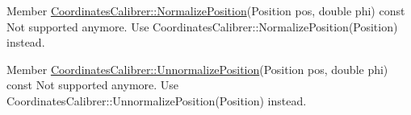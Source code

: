 \label{deprecated__deprecated000001}
\hypertarget{deprecated__deprecated000001}{}
 
\begin{DoxyDescription}
\item[Member \hyperlink{classCoordinatesCalibrer_a034180f011c23565b9b5907ce0219fbf}{CoordinatesCalibrer::NormalizePosition}(Position pos, double phi) const  ]Not supported anymore. Use CoordinatesCalibrer::NormalizePosition(Position) instead.


\end{DoxyDescription}

\label{deprecated__deprecated000002}
\hypertarget{deprecated__deprecated000002}{}
 
\begin{DoxyDescription}
\item[Member \hyperlink{classCoordinatesCalibrer_a19035a69d4d571e5e1d4baa4ba10baee}{CoordinatesCalibrer::UnnormalizePosition}(Position pos, double phi) const  ]Not supported anymore. Use CoordinatesCalibrer::UnnormalizePosition(Position) instead.


\end{DoxyDescription}